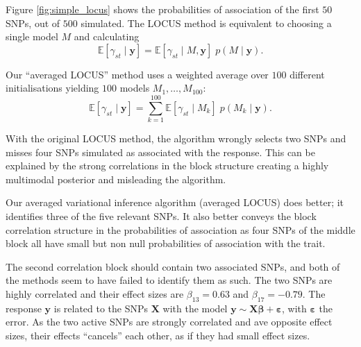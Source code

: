 \documentclass[a4paper, 11pt]{report}
\numberwithin{equation}{chapter}
\begin{document}
Figure \ref{fig:simple_locus} shows the probabilities of association of the first $50$ SNPs, out of $500$ simulated. The LOCUS method is equivalent to choosing a single model $M$ and calculating
\begin{equation*}
\mathbb{E}\left[\gamma_{st}\mid\boldsymbol{y}\right] = \mathbb{E}\left[\gamma_{st}\mid M,\boldsymbol{y}\right]\;p\left(M\mid\boldsymbol{y}\right).
\end{equation*}

Our ``averaged LOCUS'' method uses a weighted average over $100$ different initialisations yielding $100$ models $ M_1,\ldots,M_{100}$:
\begin{equation*}
\mathbb{E}\left[\gamma_{st}\mid\boldsymbol{y}\right] = \sum_{k=1}^{100}\mathbb{E}\left[\gamma_{st}\mid M_k\right]\;p\left(M_k\mid\boldsymbol{y}\right).
\end{equation*}

With the original LOCUS method, the algorithm wrongly selects two SNPs and misses four SNPs simulated as associated with the response. This can be explained by the strong correlations in the block structure creating a highly multimodal posterior and misleading the algorithm.

Our averaged variational inference algorithm (averaged LOCUS) does better; it identifies three of the five relevant SNPs. It also better conveys the block correlation structure in the probabilities of association as four SNPs of the middle block all have small but non null probabilities of association with the trait. 

The second correlation block should contain two associated SNPs, and both of the methods seem to have failed to identify them as such. The two SNPs are highly correlated and their effect sizes are $\beta_{13} = 0.63$ and $\beta_{17} = -0.79$. The response $\boldsymbol{y}$ is related to the SNPs $\boldsymbol{X}$ with the model $\boldsymbol{y} \sim \boldsymbol{X} \boldsymbol{\beta} + \boldsymbol{\varepsilon}$, with $\boldsymbol{\varepsilon}$ the error. As the two active SNPs are strongly correlated and ave opposite effect sizes, their effects ``cancels'' each other, as if they had small effect sizes.
 
%
%
\end{document}
